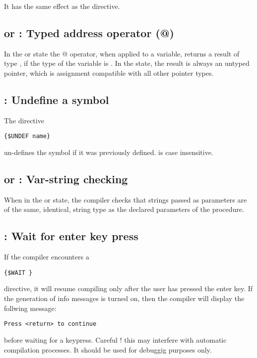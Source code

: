 \documentclass{report}
\begin{document}
It has the same effect as the  directive.

\subsection{ or  : Typed address operator (@)}

In the  or  state the @ operator,
when applied to a variable, returns a result of type , if the 
type of the variable is . In the  state, the result is
always an untyped pointer, which is assignment compatible with all other 
pointer types.

\subsection{ : Undefine a symbol}

The directive
\begin{verbatim}
{$UNDEF name}
\end{verbatim}
un-defines the symbol  if it was previously defined.
 is case insensitive.


\subsection{ or  : Var-string checking}

When in the \var{+} or  state, the compiler checks that strings 
passed as parameters are of the same, identical, string type as the declared
parameters of the procedure.

\subsection{ : Wait for enter key press}

If the compiler encounters a
\begin{verbatim}
{$WAIT }
\end{verbatim}
directive, it will resume compiling only after the user has pressed the
enter key. If the generation of info messages is turned on, then the compiler 
will display the follwing message:
\begin{verbatim}
Press <return> to continue
\end{verbatim}
before waiting for a keypress. Careful ! this may interfere with automatic
compilation processes. It should be used for debuggig purposes only.
\end{document}
